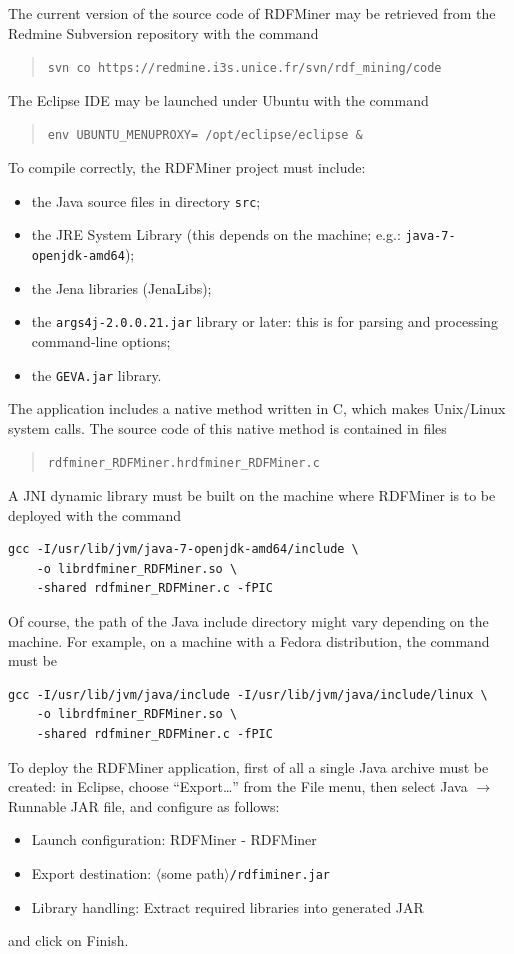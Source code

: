 \documentclass[a4paper]{article}
\newcounter{ex}
\begin{document}
The current version of the source code of RDFMiner may be retrieved from the
Redmine Subversion repository with the command
\begin{quotation}
  \texttt{svn co https://redmine.i3s.unice.fr/svn/rdf\_mining/code}
\end{quotation}
The Eclipse IDE may be launched under Ubuntu with the command
\begin{quotation}
  \texttt{env UBUNTU\_MENUPROXY=  /opt/eclipse/eclipse \&}
\end{quotation}
To compile correctly, the RDFMiner project must include:
\begin{itemize}
  \item the Java source files in directory \texttt{src};
  \item the JRE System Library (this depends on the machine; e.g.: \texttt{java-7-openjdk-amd64});
  \item the Jena libraries (JenaLibs);
  \item the \texttt{args4j-2.0.0.21.jar} library or later: this is for parsing
    and processing command-line options;
  \item the \texttt{GEVA.jar} library.
\end{itemize}
The application includes a native method written in C, which makes Unix/Linux
system calls. The source code of this native method is contained in files
\begin{quotation}
  \texttt{rdfminer\_RDFMiner.h}\quad\texttt{rdfminer\_RDFMiner.c}
\end{quotation} 
A JNI dynamic library must be built on the machine where RDFMiner
is to be deployed with the command
\begin{verbatim}
gcc -I/usr/lib/jvm/java-7-openjdk-amd64/include \
    -o librdfminer_RDFMiner.so \
    -shared rdfminer_RDFMiner.c -fPIC\end{verbatim}
Of course, the path of the Java include directory might vary depending on the machine.
For example, on a machine with a Fedora distribution, the command must be
\begin{verbatim}
gcc -I/usr/lib/jvm/java/include -I/usr/lib/jvm/java/include/linux \
    -o librdfminer_RDFMiner.so \
    -shared rdfminer_RDFMiner.c -fPIC\end{verbatim}

To deploy the RDFMiner application, first of all a single Java archive must be
created: in Eclipse, choose ``Export\dots'' from the File menu, then select
Java $\to$ Runnable JAR file, and configure as follows:
\begin{itemize}
  \item Launch configuration: RDFMiner - RDFMiner
  \item Export destination: $\langle$some path$\rangle$\texttt{/rdfiminer.jar}
  \item Library handling: Extract required libraries into generated JAR
\end{itemize}
and click on Finish.
\end{document}
